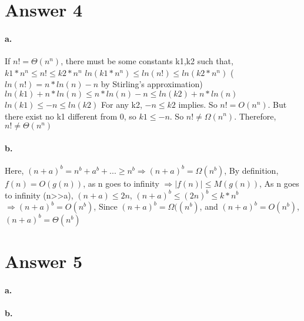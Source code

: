 \documentclass[11pt]{article}
\begin{document}
\section*{Answer 4}
\paragraph{a.} If  $n! = \Theta(n^n)$, there must be some constants k1,k2 such that,
\newline $k1 * n^n \leq n! \leq k2 * n^n $
\newline $ln(k1 * n^n) \leq ln(n!) \leq ln(k2 * n^n) $
\newline ($ln(n!) = n*ln(n) - n$ by Stirling's approximation) $ln(k1) + n*ln(n) \leq n*ln(n) - n \leq ln(k2) + n*ln(n) $ 
\newline $ln(k1) \leq - n \leq ln(k2) $
\newline For any k2, $-n \leq k2 $ implies. So $n! = O(n^n)$.
\newline But there exist no k1 different from 0, so $k1 \leq -n $. So $n! \neq \Omega(n^n)$.
\newline Therefore, $n! \neq \Theta(n^n)$

\paragraph{b.} Here, $(n+a)^b = n^b+a^b+...  \geq n^b \Rightarrow (n+a)^b= \Omega (n^b)$,
\newline By definition, $ f(n) = O(g(n))$, as n goes to infinity $\Rightarrow \lvert f(n) \rvert \leq M(g(n))$,
\newline As n goes to infinity (n>>a), $(n+a) \leq 2n$,
\newline $(n+a)^b \leq (2n)^b \leq k*n^b$ $\Rightarrow (n+a)^b = O(n^b)$,
\newline Since $(n+a)^b = \Omega((n^b)$, and $(n+a)^b = O(n^b)$,
\newline $(n+a)^b = \Theta (n^b)$

\section*{Answer 5}
\paragraph{a.}
\paragraph{b.}
\end{document}
